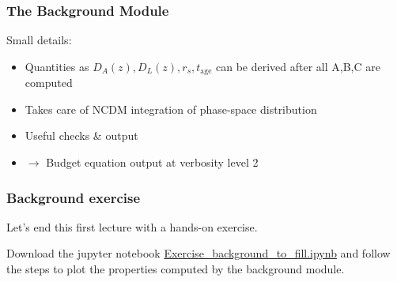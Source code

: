 \begin{frame}[fragile]
	\frametitle{The Background Module}

	Small details:
	\begin{itemize}
		\item Quantities as $D_A(z), D_L(z), r_s, t_\mathrm{age}$ can be derived after all A,B,C are computed
		\item Takes care of NCDM integration of phase-space distribution
		\item Useful checks \& output
		\item $\to$ Budget equation output at verbosity level 2
	\end{itemize}
	
\end{frame}

\begin{frame}[fragile]
	\frametitle{Background exercise}
Let's end this first lecture with a hands-on exercise.

Download the jupyter notebook \href{https://github.com/MarkMos/class_lecture/blob/main/notebooks/Exercise_background_to_fill.ipynb}{Exercise\_background\_to\_fill.ipynb} and follow the steps to plot the properties computed by the background module.


\end{frame}




